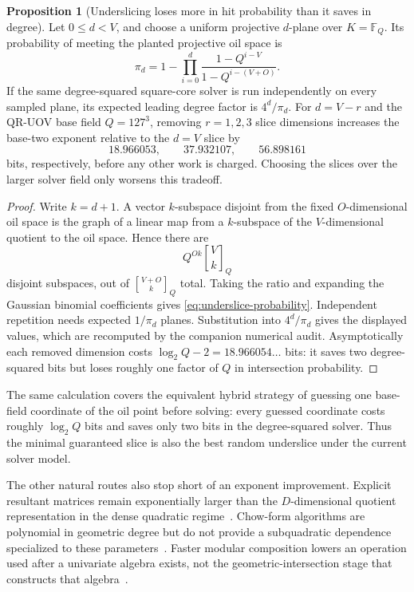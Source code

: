 \documentclass[11pt,a4paper]{article}
\theoremstyle{definition}
\newtheorem{proposition}[theorem]{Proposition}
\theoremstyle{remark}
\newcommand{\F}{\mathbb F}
\newcommand{\QRUOV}{\textsf{QR-UOV}}
\begin{document}
\begin{proposition}[Underslicing loses more in hit probability than it saves in degree]\label{prop:underslice}
Let $0\le d<V$, and choose a uniform projective $d$-plane over $K=\F_Q$.  Its probability of meeting the planted projective oil space is
\begin{equation}\label{eq:underslice-probability}
\pi_d
=1-\prod_{i=0}^{d}
\frac{1-Q^{i-V}}{1-Q^{i-(V+O)}}.
\end{equation}
If the same degree-squared square-core solver is run independently on every sampled plane, its expected leading degree factor is $4^d/\pi_d$.  For $d=V-r$ and the \QRUOV{} base field $Q=127^3$, removing $r=1,2,3$ slice dimensions increases the base-two exponent relative to the $d=V$ slice by
\[
18.966053,\qquad37.932107,\qquad56.898161
\]
bits, respectively, before any other work is charged.  Choosing the slices over the larger solver field only worsens this tradeoff.
\end{proposition}

\begin{proof}
Write $k=d+1$.  A vector $k$-subspace disjoint from the fixed $O$-dimensional oil space is the graph of a linear map from a $k$-subspace of the $V$-dimensional quotient to the oil space.  Hence there are
\[
Q^{Ok}\genfrac{[}{]}{0pt}{}{V}{k}_Q
\]
disjoint subspaces, out of $\genfrac{[}{]}{0pt}{}{V+O}{k}_Q$ total.  Taking the ratio and expanding the Gaussian binomial coefficients gives \eqref{eq:underslice-probability}.  Independent repetition needs expected $1/\pi_d$ planes.  Substitution into $4^d/\pi_d$ gives the displayed values, which are recomputed by the companion numerical audit.  Asymptotically each removed dimension costs $\log_2Q-2=18.966054\ldots$ bits: it saves two degree-squared bits but loses roughly one factor of $Q$ in intersection probability.
\end{proof}

The same calculation covers the equivalent hybrid strategy of guessing one base-field coordinate of the oil point before solving: every guessed coordinate costs roughly $\log_2Q$ bits and saves only two bits in the degree-squared solver.  Thus the minimal guaranteed slice is also the best random underslice under the current solver model.

The other natural routes also stop short of an exponent improvement.  Explicit resultant matrices remain exponentially larger than the $D$-dimensional quotient representation in the dense quadratic regime~\cite{DAndreaDickenstein}.  Chow-form algorithms are polynomial in geometric degree but do not provide a subquadratic dependence specialized to these parameters~\cite{JeronimoEtAl}.  Faster modular composition lowers an operation used after a univariate algebra exists, not the geometric-intersection stage that constructs that algebra~\cite{NeigerEtAl}.
\end{document}
